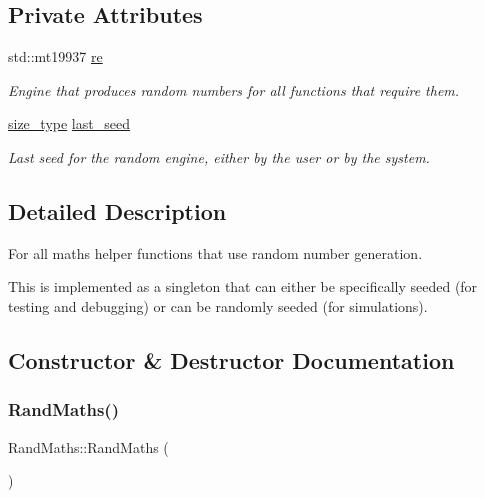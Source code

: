 \subsection*{Private Attributes}
\begin{DoxyCompactItemize}
\item 
std\+::mt19937 \hyperlink{classretrocombinator_1_1RandMaths_a8455f3a94efd124edd0ecfc806744476}{re}
\begin{DoxyCompactList}\small\item\em Engine that produces random numbers for all functions that require them. \end{DoxyCompactList}\item 
\hyperlink{constants_8h_a8e1541b50cee66a791df4c437ccbb385}{size\+\_\+type} \hyperlink{classretrocombinator_1_1RandMaths_ab5b6bec8e0eaea80efe565cddc8e69ac}{last\+\_\+seed}
\begin{DoxyCompactList}\small\item\em Last seed for the random engine, either by the user or by the system. \end{DoxyCompactList}\end{DoxyCompactItemize}


\subsection{Detailed Description}
For all maths helper functions that use random number generation. 

This is implemented as a singleton that can either be specifically seeded (for testing and debugging) or can be randomly seeded (for simulations). 

\subsection{Constructor \& Destructor Documentation}
\mbox{\label{classretrocombinator_1_1RandMaths_aa507e7465f9a650d560aa42c7f75310f}} 
\subsubsection{\texorpdfstring{Rand\+Maths()}{RandMaths()}\hspace{0.1cm}{\footnotesize\ttfamily [1/2]}}
{\footnotesize\ttfamily Rand\+Maths\+::\+Rand\+Maths (\begin{DoxyParamCaption}{ }\end{DoxyParamCaption})\hspace{0.3cm}{\ttfamily [private]}}



